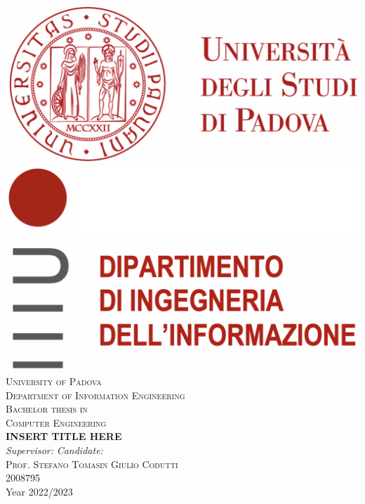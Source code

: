 







\begin{titlepage}
    \begin{center}
        \includegraphics[scale=0.25]{images/logo_unipd.png} \hfill
        \includegraphics[scale=0.25]{images/logo_dei.png}\\
        \vspace{1.0cm}
        \textsc{\LARGE University of Padova}\\
        \vspace{0.45cm}
        \textsc{\large Department of Information Engineering}\\
        \vspace{0.4cm}
        \textsc{\large Bachelor thesis in }\\
        \textsc{\large Computer Engineering}\\
        \vfill
        { \LARGE \bfseries INSERT TITLE HERE
        }\\
        \vfill
        \textit{\large Supervisor:} \hfill \textit{\large Candidate:}\\
        \textsc{\large Prof. Stefano Tomasin} \hfill \textsc{Giulio Codutti}\\
        \hfill \textsc{2008795}\\

        \vfill
        {\large Year 2022/2023}
    \end{center}
\end{titlepage}


